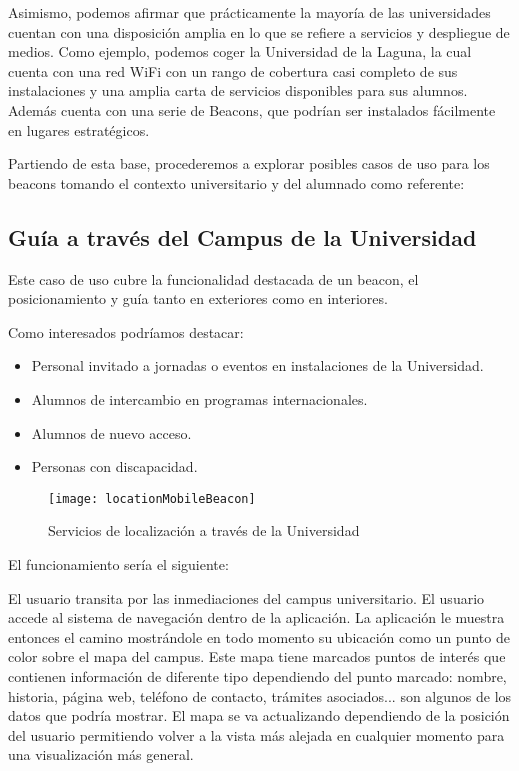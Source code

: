 Asimismo, podemos afirmar que prácticamente la mayoría de las universidades cuentan con una disposición amplia en lo que se refiere a servicios y despliegue de medios. Como ejemplo, podemos coger la Universidad de la Laguna, la cual cuenta con una red WiFi con un rango de cobertura casi completo de sus instalaciones y una amplia carta de servicios disponibles para sus alumnos. Además cuenta con una serie de Beacons, que podrían ser instalados fácilmente en lugares estratégicos. 

Partiendo de esta base, procederemos a explorar posibles casos de uso para los beacons tomando el contexto universitario y del alumnado como referente:

\subsection{Guía a través del Campus de la Universidad}

Este caso de uso cubre la funcionalidad destacada de un beacon, el posicionamiento y guía tanto en exteriores como en interiores. 

Como interesados podríamos destacar: 

\begin{itemize}
\item Personal invitado a jornadas o eventos en instalaciones de la Universidad.
\item Alumnos de intercambio en programas internacionales.
\item Alumnos de nuevo acceso.
\item Personas con discapacidad.
\end{itemize}

\begin{figure}[h]
	\centering
	\texttt{[image: locationMobileBeacon]}
	\caption{Servicios de localización a través de la Universidad}
	\label{fig:beaconLocation}
\end{figure}

El funcionamiento sería el siguiente: 

El usuario transita por las inmediaciones del campus universitario. El usuario accede al sistema de navegación dentro de la aplicación. La aplicación le muestra entonces el camino mostrándole en todo momento su ubicación como un punto de color sobre el mapa del campus. Este mapa tiene marcados puntos de interés que contienen información de diferente tipo dependiendo del punto marcado: nombre, historia, página web, teléfono de contacto, trámites asociados... son algunos de los datos que podría mostrar. El mapa se va actualizando dependiendo de la posición del usuario permitiendo volver a la vista más alejada en cualquier momento para una visualización más general.



